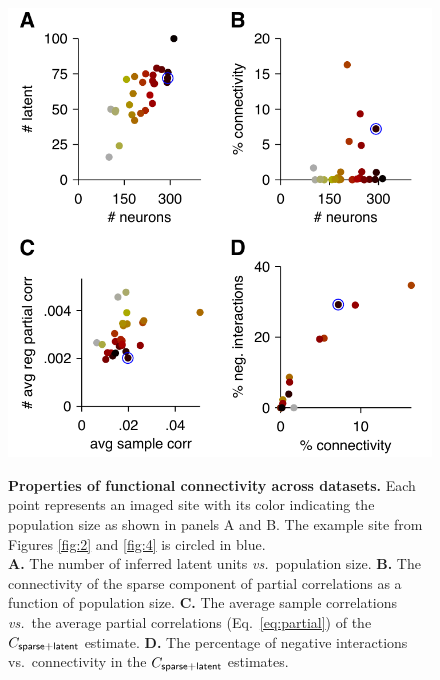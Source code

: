 \begin{figure}
\begin{fullpage}
    \begin{center}
        \includegraphics{./figures/Stats.pdf}
    \end{center}

\begin{caption}
{\bf Properties of functional connectivity across datasets.}
Each point represents an imaged site with its color indicating the population size as shown in panels A and B. The example site from Figures \ref{fig:2} and \ref{fig:4} is circled in blue.
\\
{\bf A.} The number of inferred latent units \emph{vs.}~population size.
{\bf B.} The connectivity of the sparse component of partial correlations as a function of population size.
{\bf C.} The average sample correlations \emph{vs.}~the average partial correlations (Eq.~\ref{eq:partial}) of the $C_{\sf sparse+latent}$ estimate.
{\bf D.} The percentage of negative interactions vs.~connectivity in the $C_{\sf sparse+latent}$ estimates.

\end{caption} \label{fig:5}

\end{fullpage}
\end{figure}
